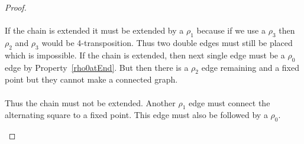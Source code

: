 \begin{proof}
\begin{figure}[H]
\begin{center}
      \caption{}
    \end{center}
  \end{figure}

  \paragraph{}
  If the chain is extended it must be extended by a $\rho_1$ because if we use a $\rho_3$ then $\rho_2$ and $\rho_3$ would be 4-transposition. Thus two double edges must still be placed which is impossible. If the chain is extended, then next single edge must be a $\rho_0$ edge by Property~\ref{rho0atEnd}. But then there is a $\rho_2$ edge remaining and a fixed point but they cannot make a connected graph.

  \paragraph{}
  Thus the chain must not be extended. Another $\rho_1$ edge must connect the alternating square to a fixed point. This edge must also be followed by a $\rho_0$.

  \begin{figure}[H]
    \begin{center}
\end{center}
\end{figure}
\end{proof}

